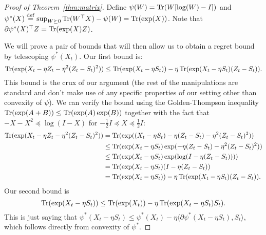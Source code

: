 \documentclass[11pt]{article}
\begin{document}
\begin{proof}[Proof of Theorem~\ref{thm:matrix}]
Define $\psi(W) = \operatorname{Tr}(W[\log(W)-I])$ and $\psi^*(X) \stackrel{\mathrm{def}}{=} \sup_{W \succeq 0} \operatorname{Tr}(W^{\top}X) - \psi(W) = \operatorname{Tr}(\exp(X))$. 
Note that $\partial \psi^*(X)^{\top}Z = \operatorname{Tr}(\exp(X)Z)$.

We will prove a pair of bounds that will then allow us to obtain a regret bound by telescoping $\psi^*(X_t)$. 
Our first bound is:
\begin{equation}
\label{eqn:bound-1}
\operatorname{Tr}(\exp(X_t - \eta Z_t - \eta^2 (Z_t - S_t)^2 )) \leq \operatorname{Tr}(\exp(X_t - \eta S_t)) - \eta \operatorname{Tr}(\exp(X_t - \eta S_t)(Z_t - S_t)).
\end{equation}
This bound is the crux of our argument (the rest of the manipulations are standard and don't make use of 
any specific properties of our setting other than convexity of $\psi$). We can verify the bound 
using the Golden-Thompson inequality $\operatorname{Tr}(\exp(A+B)) \leq \operatorname{Tr}(\exp(A)\exp(B))$ together 
with the fact that $-X-X^2 \preceq \log(I-X)$ for $-\frac{1}{2}I \preceq X \preceq \frac{1}{2}I$:
\begin{align}
\operatorname{Tr}(\exp(X_t - \eta Z_t - \eta^2 (Z_t - S_t)^2)) &= \operatorname{Tr}(\exp((X_t - \eta S_t) - \eta (Z_t - S_t) - \eta^2 (Z_t - S_t)^2)) \\
 &\leq \operatorname{Tr}(\exp(X_t - \eta S_t)\exp(-\eta (Z_t - S_t) - \eta^2 (Z_t - S_t)^2)) \\
 &\leq \operatorname{Tr}(\exp(X_t - \eta S_t)\exp(\log(I - \eta (Z_t - S_t)))) \\
 &= \operatorname{Tr}(\exp(X_t - \eta S_t)(I - \eta (Z_t - S_t)) \\
 &= \operatorname{Tr}(\exp(X_t - \eta S_t)) - \eta \operatorname{Tr}(\exp(X_t - \eta S_t)(Z_t - S_t)).
\end{align}
Our second bound is
\begin{equation}
\label{eqn:bound-2}
\operatorname{Tr}(\exp(X_t - \eta S_t)) \leq \operatorname{Tr}(\exp(X_t)) - \eta \operatorname{Tr}(\exp(X_t - \eta S_t)S_t).
\end{equation}
This is just saying that $\psi^*(X_t - \eta S_t) \leq \psi^*(X_t) - \eta \langle \partial \psi^*(X_t - \eta S_t), S_t \rangle$, 
which follows directly from convexity of $\psi^*$.


\end{proof}
\end{document}
